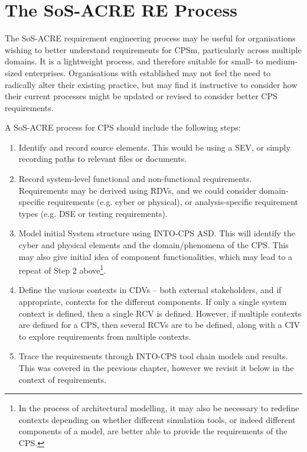 \section{The SoS-ACRE RE Process}

The SoS-ACRE requirement engineering process may be useful for organisations wishing to better understand requirements for CPSm, particularly across multiple domains. It is a lightweight process, and therefore suitable for small- to medium-sized enterprises. Organisations with established may not feel the need to radically alter their existing practice, but may find it instructive to consider how their current processes might be updated or revised to consider better CPS requirements.


A SoS-ACRE process for CPS should include the following steps:

\begin{enumerate}
\item Identify and record source elements. This would be using a SEV, or simply recording paths to relevant files or documents.

\item Record system-level functional and non-functional requirements. Requirements may be derived using RDVs, and we could consider domain-specific requirements (e.g. cyber or physical), or analysis-specific requirement types (e.g. DSE or testing requirements).

\item Model initial System structure using INTO-CPS ASD. This will identify the cyber and physical elements and the domain/phenomena of the CPS. This may also give initial idea of component functionalities, which may lead to a repeat of Step 2 above\footnote{In the process of architectural modelling, it may also be necessary to redefine contexts depending on whether different simulation tools, or indeed different components of a model, are better able to provide the requirements of the CPS.}.

\item Define the various contexts in CDVs -- both external stakeholders, and if appropriate, contexts for the different components. If only a single system context is defined, then a single RCV is defined. However, if multiple contexts are defined for a CPS, then several RCVs are to be defined, along with a CIV to explore requirements from multiple contexts.

\item Trace the requirements through INTO-CPS tool chain models and results. This was covered in the previous chapter, however we revisit it below in the context of requirements.
\end{enumerate}

